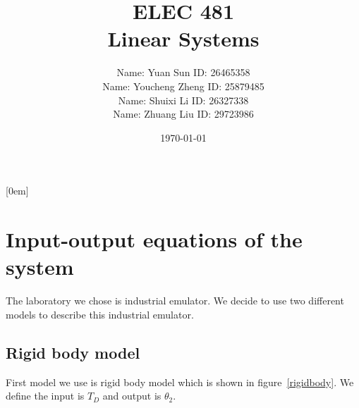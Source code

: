 \documentclass[a4paper, 12pt]{article}
\newcommand{\subtitle}[1]{
	\posttitle{
		\par\end{center}
		\begin{center}\large#1\end{center}
		\vskip0.5em}
}
\begin{document}
\begin{titlepage}

\title{\huge{ELEC 481\\ \large{Linear Systems \vspace{5ex}}}}
	\subtitle{\large{Lab Report} \\  \large{}
	\vspace{15ex}}
	

\author{
Name: Yuan Sun  \hspace{15ex}  ID: 26465358  \\
Name: Youcheng Zheng  \hspace{8.5ex}  ID: 25879485  \\
Name: Shuixi Li \hspace{15.2ex}  ID: 26327338 \\
\hspace{0.1ex}
Name: Zhuang Liu	\hspace{13ex}  ID: 29723986 \vspace{18ex}}


\date{\today}

\clearpage
\maketitle                       %
\thispagestyle{empty}  %
\end{titlepage}
\newpage



\tableofcontents
{}
[0em]
{\filcenter\large\bfseries}
{\contentslabel{3ex}}
{}
{\titlerule*{$\cdot$} \contentspage}  
\clearpage        
\newpage

\listoffigures
\listoftables
\clearpage        
\newpage

\setcounter{page}{1}

\section{Input-output equations of the system}\label{Equations}
\hspace{2.5ex}The laboratory we chose is industrial emulator. We decide to use two different models to describe this industrial emulator. 

\subsection{Rigid body model}
First model we use is rigid body model which is shown in figure~\ref{rigidbody}. We define the input is $T_D$ and output is $\theta_2$.
\end{document}
